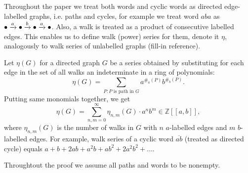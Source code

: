 %	


Throughout the paper we treat both words and cyclic words as directed edge-labelled graphs, i.e. paths and cycles, for example we treat word $aba$ as $\bullet\xrightarrow{a}\bullet\xrightarrow{b}\bullet\xrightarrow{a}\bullet$. Also, a walk is treated as a product of consecutive labelled edges. This enables us to define walk (power) series for them, denote it $\eta$, analogously to walk series of unlabelled graphs (fill-in reference).

Let $\eta(G)$ for a directed graph $G$ be a series obtained by substituting for each edge in the set of all walks an indeterminate in a ring of polynomials:
$$
\eta(G) = \sum_{P: P \text{ is path in } G}a^{\#_a(P)}b^{\#_b(P)}.
$$
Putting same monomials together, we get $$\eta(G) = \sum_{n,m=0}^{\infty}\eta_{n,m}(G)\cdot a^n b^m \in \mathbb{Z}[[a,b]],$$ where $\eta_{n,m}(G)$ is the number of walks in $G$ with $n$ $a$-labelled edges and $m$ $b$-labelled edges. For example, walk series of a cyclic word $\overline{ab}$ (treated as directed cycle) equals $a + b + 2ab + a^2b + ab^2+2a^2b^2+\ldots.$

\iffalse

Throughtout the proof we assume all paths and words to be nonempty.

